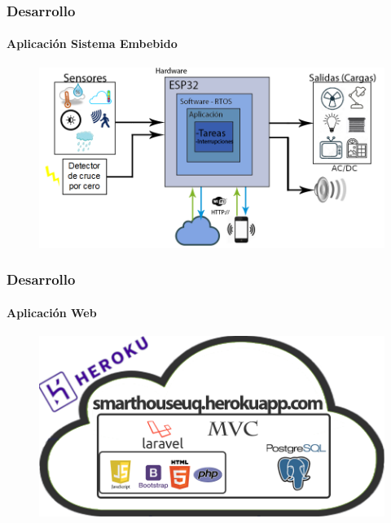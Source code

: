 \begin{frame}
\frametitle{Desarrollo}
\framesubtitle{Aplicación Sistema Embebido}

\begin{figure}
	\centering
	\caption{}
	\label{fig:baplicacion}
	\includegraphics[width=0.7\linewidth]{Imagenes/B_Aplicacion}
\end{figure}


\end{frame}

\begin{frame}
\frametitle{Desarrollo}
\framesubtitle{Aplicación Web}

\begin{figure}
	\centering
	\caption{}
	\label{fig:bappweb}
	\includegraphics[width=0.7\linewidth]{Imagenes/B_ImplAPPweb}
\end{figure}


\end{frame}